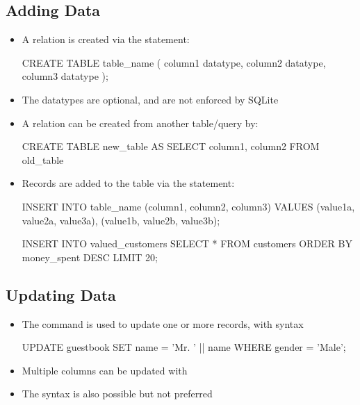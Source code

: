 \documentclass[a4paper]{article}
\begin{document}
\subsection{Adding Data}
\begin{itemize}
    \item A relation is created via the  statement:
\begin{sql}
CREATE TABLE table_name (
    column1 datatype,
    column2 datatype,
    column3 datatype
);
\end{sql}
    \item The datatypes are optional, and are not enforced by SQLite
    \item A relation can be created from another table/query by:
    \begin{sql}
CREATE TABLE new_table AS
SELECT column1, column2
FROM old_table
\end{sql}
\item Records are added to the table via the  statement:
    \begin{sql}
INSERT INTO table_name (column1, column2, column3)
VALUES (value1a, value2a, value3a),
       (value1b, value2b, value3b);
\end{sql}
\begin{sql}
INSERT INTO valued_customers
SELECT * FROM customers
ORDER BY money_spent DESC
LIMIT 20;
\end{sql}
\end{itemize}

\subsection{Updating Data}
\begin{itemize}
    \item The  command is used to update one or more records, with syntax 
\begin{sql}
UPDATE guestbook
SET name = 'Mr. ' || name
WHERE gender = 'Male';
\end{sql}
\item Multiple columns can be updated with 
\item The syntax  is also possible but not preferred
\end{itemize}
\end{document}
